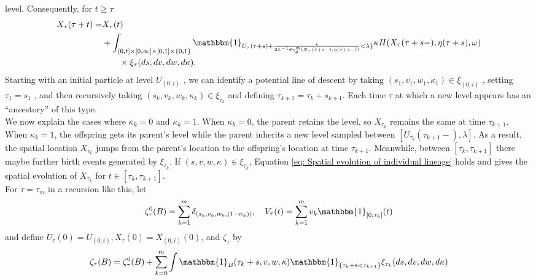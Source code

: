 \documentclass[12pt]{article}
\begin{document}
level. Consequently, for $t \geq \tau$
\begin{align}\label{eq: Spatial evolution of individual lineage}
X_{\tau}(\tau+t)=&X_{\tau}(t)\\
&+\int_{(0,t]\times[0,\infty]\times[0,1]\times\{0,1\}}\mathbbm{1}_{U_{\tau}(\tau+s)+ \frac{v}{2\lambda^{-1} \theta \gamma^{\mathfrak{m}}_{\theta}(X_{\tau}(\tau+s-), \eta(\tau+s-))}<\lambda\}}\kappa    H(X_{\tau}(\tau+s-), \eta(\tau+s),\omega) \\
&\qquad \times \xi_{\tau}(ds,dv,dw,d\kappa).
\end{align}
Starting with an initial particle at level $U_{(0,i)}$ , we can identify a potential line of descent by
taking $(s_1 , v_1 , w_1 , \kappa_1 ) \in \xi_{(0,i)}$ , setting $\tau_1=s_1$ , and then recursively taking $(s_k , v_k , w_k , \kappa_k ) \in \xi_{\tau_k }$ and defining $\tau_{k+1} = \tau_{k} + s_{k+1}$. Each time $\tau$ at which a new level appears has an “ancestory” of this type.\\
We now explain the cases where $\kappa_k=0$ and $\kappa_k=1$. When $\kappa_k=0$, the parent retains the level, so $X_{\tau_{k}}$ remains the same at time $\tau_{k+1}$. When $\kappa_k=1$, the offspring gets its parent's level while the parent inherits a new level sampled between $[U_{\tau_k}(\tau_{k+1}-),\lambda]$. As a result, the spatial location $X_{\tau_{k}}$ jumps from the parent's location to the offspring's location at time $\tau_{k+1}$.  Meanwhile, between $[\tau_k, \tau_{k+1}]$ there maybe further birth events generated by $\xi_{\tau_k}$. If $(s,v,w,\kappa) \in \xi_{\tau_k}$, Equation \eqref{eq: Spatial evolution of individual lineage} holds and gives the spatial evolution of $X_{\tau_k}$ for $t \in [\tau_k, \tau_{k+1}]$.\\

For $\tau=\tau_m$ in a recursion like this, let
\begin{equation}\label{eq: Individual Evolution Recursion Terms}
\zeta^{0}_{\tau}(B)=\sum_{k=1}^{m}\delta_{(s_k,v_k,w_k,(1-\kappa_k))}, ~~~ V_{\tau}(t)=\sum_{k=1}^{m}v_k\mathbbm{1}_{[0, \tau_k]}  (t)  
\end{equation}
and define $U_{\tau}(0)=U_{(0,i)}, X_{\tau}(0)=X_{(0,i)}(0)$, and $\zeta_{\tau}$ by
\begin{equation}\label{eq: integrand in spatial tracing}
\zeta_{\tau}(B)=\zeta_{\tau}^{0}(B)+\sum_{k=0}^{m}\int \mathbbm{1}_{B}(\tau_k+s,v,w,\kappa)\mathbbm{1}_{\{\tau_k+s<\tau_{k+1}\}}\xi_{\tau_k}(ds,dv,dw,d\kappa)    
\end{equation}
\end{document}
